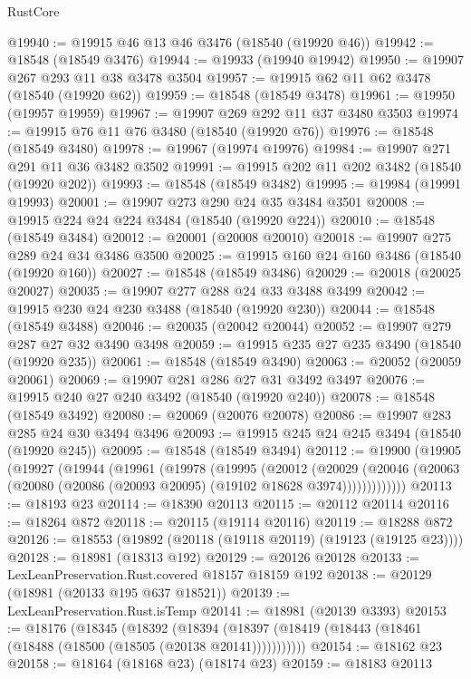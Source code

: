 \begin{lexlean}{RustCore}
\begin{coremodule}
@19940 := @19915 @46 @13 @46 @3476 (@18540 (@19920 @46))
@19942 := @18548 (@18549 @3476)
@19944 := @19933 (@19940 @19942)
@19950 := @19907 @267 @293 @11 @38 @3478 @3504
@19957 := @19915 @62 @11 @62 @3478 (@18540 (@19920 @62))
@19959 := @18548 (@18549 @3478)
@19961 := @19950 (@19957 @19959)
@19967 := @19907 @269 @292 @11 @37 @3480 @3503
@19974 := @19915 @76 @11 @76 @3480 (@18540 (@19920 @76))
@19976 := @18548 (@18549 @3480)
@19978 := @19967 (@19974 @19976)
@19984 := @19907 @271 @291 @11 @36 @3482 @3502
@19991 := @19915 @202 @11 @202 @3482 (@18540 (@19920 @202))
@19993 := @18548 (@18549 @3482)
@19995 := @19984 (@19991 @19993)
@20001 := @19907 @273 @290 @24 @35 @3484 @3501
@20008 := @19915 @224 @24 @224 @3484 (@18540 (@19920 @224))
@20010 := @18548 (@18549 @3484)
@20012 := @20001 (@20008 @20010)
@20018 := @19907 @275 @289 @24 @34 @3486 @3500
@20025 := @19915 @160 @24 @160 @3486 (@18540 (@19920 @160))
@20027 := @18548 (@18549 @3486)
@20029 := @20018 (@20025 @20027)
@20035 := @19907 @277 @288 @24 @33 @3488 @3499
@20042 := @19915 @230 @24 @230 @3488 (@18540 (@19920 @230))
@20044 := @18548 (@18549 @3488)
@20046 := @20035 (@20042 @20044)
@20052 := @19907 @279 @287 @27 @32 @3490 @3498
@20059 := @19915 @235 @27 @235 @3490 (@18540 (@19920 @235))
@20061 := @18548 (@18549 @3490)
@20063 := @20052 (@20059 @20061)
@20069 := @19907 @281 @286 @27 @31 @3492 @3497
@20076 := @19915 @240 @27 @240 @3492 (@18540 (@19920 @240))
@20078 := @18548 (@18549 @3492)
@20080 := @20069 (@20076 @20078)
@20086 := @19907 @283 @285 @24 @30 @3494 @3496
@20093 := @19915 @245 @24 @245 @3494 (@18540 (@19920 @245))
@20095 := @18548 (@18549 @3494)
@20112 := @19900
    (@19905
      (@19927
        (@19944
          (@19961
            (@19978
              (@19995
                (@20012
                  (@20029
                    (@20046
                      (@20063 (@20080 (@20086 (@20093 @20095) (@19102 @18628 @3974)))))))))))))
@20113 := @18193 @23
@20114 := @18390 @20113
@20115 := @20112 @20114
@20116 := @18264 @872
@20118 := @20115 (@19114 @20116)
@20119 := @18288 @872
@20126 := @18553 (@19892 (@20118 (@19118 @20119) (@19123 (@19125 @23))))
@20128 := @18981 (@18313 @192)
@20129 := @20126 @20128
@20133 := LexLeanPreservation.Rust.covered @18157 @18159 @192
@20138 := @20129 (@18981 (@20133 @195 @637 @18521))
@20139 := LexLeanPreservation.Rust.isTemp
@20141 := @18981 (@20139 @3393)
@20153 := @18176
    (@18345
      (@18392
        (@18394 (@18397 (@18419 (@18443 (@18461 (@18488 (@18500 (@18505 (@20138 @20141)))))))))))
@20154 := @18162 @23
@20158 := @18164 (@18168 @23) (@18174 @23)
@20159 := @18183 @20113

\end{coremodule}
\end{lexlean}
